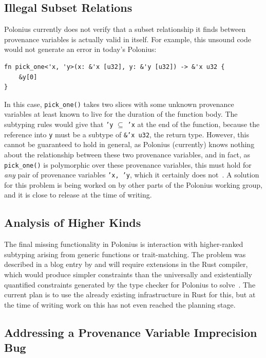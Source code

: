 \documentclass[11pt,a4paper,twoside,openany]{report}
\newcommand{\InRust}[1]{\texttt{#1}}
\begin{document}
\subsection{Illegal Subset Relations}\label{sec:missing-features:illegal-subset-relations}

Polonius currently does not verify that a subset relationship it finds between
provenance variables is actually valid in itself. For example, this unsound code
would not generate an error in today's Polonius:
\begin{verbatim}
fn pick_one<'x, 'y>(x: &'x [u32], y: &'y [u32]) -> &'x u32 {
    &y[0]
}
\end{verbatim}

In this case, \InRust{pick_one()} takes two slices with some unknown provenance
variables at least known to live for the duration of the function body. The
subtyping rules would give that \InRust{'y} $\subseteq$ \InRust{'x} at the end
of the function, because the reference into \InRust{y} must be a subtype of
\InRust{&'x u32}, the return type. However, this cannot be guaranteed to hold in
general, as Polonius (currently) knows nothing about the relationship between
these two provenance variables, and in fact, as \InRust{pick_one()} is
polymorphic over these provenance variables, this must hold for \emph{any} pair
of provenance variables \InRust{'x, 'y}, which it certainly does
not~\cite{matsakis_polonius_2019-1}. A solution for this problem is being worked
on by other parts of the Polonius working group, and it is close to release at
the time of writing.

\subsection{Analysis of Higher Kinds}\label{sec:missing-features:higher-kinds}

The final missing functionality in Polonius is interaction with higher-ranked
subtyping arising from generic functions or trait-matching. The problem was
described in a blog entry by \citeauthor*{matsakis_polonius_2019} and will
require extensions in the Rust compiler, which would produce simpler constraints
than the universally and existentially quantified constraints generated by the
type checker for Polonius to solve~\cite{matsakis_polonius_2019}. The current
plan is to use the already existing infrastructure in Rust for this, but at the
time of writing work on this has not even reached the planning stage.

\subsection{Addressing a Provenance Variable Imprecision Bug}\label{sec:missing-features:provenance-variable-equality}
\end{document}

